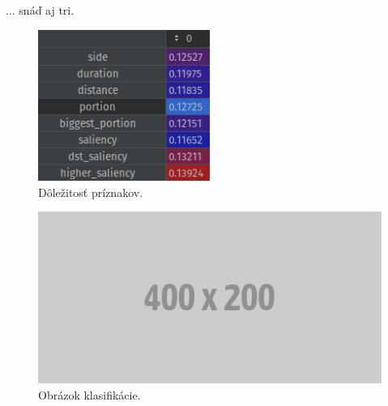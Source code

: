 \newpage

... snáď aj tri.

\begin{figure}[ht]
    \centering
    \includegraphics[width=0.5\textwidth]{images/05/importance.png}
    \caption{Dôležitosť príznakov.}
    \label{img:road}
\end{figure}

\begin{figure}[ht]
    \centering
    \includegraphics[width=1\textwidth]{images/placeholder.png}
    \caption{Obrázok klasifikácie.}
    \label{img:road}
\end{figure}

